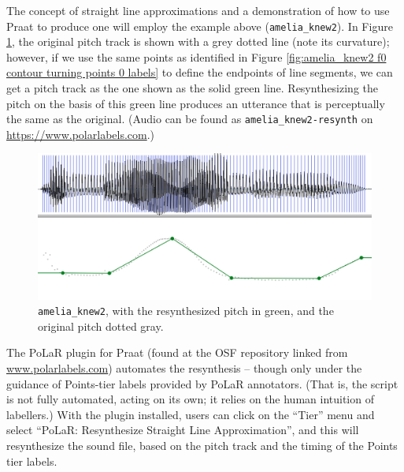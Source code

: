 \documentclass[11pt, twoside]{memoir}
\begin{document}
The concept of straight line approximations and a demonstration of how to use Praat to produce one will employ the example above (\texttt{amelia\_knew2}). In Figure \ref{fig:amelia_knew2 resynth}, the original pitch track is shown with a grey dotted line (note its curvature); however, if we use the same points as identified in Figure \ref{fig:amelia_knew2 f0 contour turning points 0 labels} to define the endpoints of line segments, we can get a pitch track as the one shown as the solid green line. Resynthesizing the pitch on the basis of this green line produces an utterance that is perceptually the same as the original. (Audio can be found as \texttt{amelia\_knew2-resynth} on \url{https://www.polarlabels.com}.)

\begin{figure}[H]
\centering
%
\includegraphics[width=.875\linewidth]{Points-amelia_knew2-resynth.png}
%
\caption{\texttt{amelia\_knew2}, with the resynthesized pitch in green, and the original pitch dotted gray.%
\label{fig:amelia_knew2 resynth}%
}
\end{figure}

The PoLaR plugin for Praat (found at the OSF repository linked from \href{https://www.polarlabels.com}{www.polarlabels.com}) automates the resynthesis – though only under the guidance of Points-tier labels provided by PoLaR annotators. (That is, the script is not fully automated, acting on its own; it relies on the human intuition of labellers.) With the plugin installed, users can click on the “Tier” menu and select “PoLaR: Resynthesize Straight Line Approximation”, and this will resynthesize the sound file, based on the pitch track and the timing of the Points tier labels.
\end{document}
